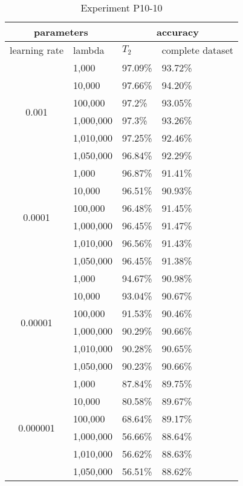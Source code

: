 \begin{table}[H]
    \centering
    \begin{tabular}{ |c|l|l|l|  }
        \hline
        \multicolumn{2}{|c|}{parameters} & \multicolumn{2}{c|}{accuracy} \\
        \hline
        learning rate & lambda & $T_2$ & complete dataset\\
        \hline
        \hline
        \multirow{6}{*}{0.001} & 1,000 & 97.09\% & 93.72\%\\
                            & 10,000 & 97.66\% & 94.20\%\\
                            & 100,000 & 97.2\% & 93.05\% \\
                            & 1,000,000 & 97.3\% & 93.26\% \\
                            & 1,010,000 & 97.25\% & 92.46\% \\
                            & 1,050,000 & 96.84\% & 92.29\% \\
        \hline
        \multirow{6}{*}{0.0001} & 1,000 & 96.87\% & 91.41\%\\
                                & 10,000 & 96.51\% & 90.93\%\\
                                & 100,000 & 96.48\% & 91.45\% \\
                                & 1,000,000 & 96.45\% & 91.47\% \\
                                & 1,010,000 & 96.56\% & 91.43\% \\
                                & 1,050,000 & 96.45\% & 91.38\% \\
        \hline
        \multirow{6}{*}{0.00001} & 1,000 & 94.67\% & 90.98\%\\
                                & 10,000 & 93.04\% & 90.67\%\\
                                & 100,000 & 91.53\% & 90.46\% \\
                                & 1,000,000 & 90.29\% & 90.66\% \\
                                & 1,010,000 & 90.28\% & 90.65\% \\
                                & 1,050,000 & 90.23\% & 90.66\% \\
        \hline
        \multirow{6}{*}{0.000001} & 1,000 & 87.84\% & 89.75\% \\
                                & 10,000 & 80.58\% & 89.67\% \\
                                & 100,000 & 68.64\% & 89.17\% \\
                                & 1,000,000 & 56.66\% & 88.64\% \\
                                & 1,010,000 & 56.62\% & 88.63\% \\
                                & 1,050,000 & 56.51\% & 88.62\% \\
        \hline
    \end{tabular}
    \caption{Experiment P10-10}
    \label{table:exp_p10-10}
\end{table}

